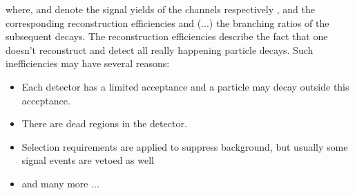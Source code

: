 where, \NDp and \NLc denote the signal yields of the channels \LbToDpmunuX respectively \LbToLcmunu, \effDp and \effLc the corresponding reconstruction efficiencies and \BR(...) the branching ratios of the subsequent decays.
The reconstruction efficiencies describe the fact that one doesn't reconstruct and detect all really happening particle decays.
Such inefficiencies may have several reasons:
\begin{itemize}
    \item Each detector has a limited acceptance and a particle may decay outside this acceptance.
    \item There are dead regions in the detector.
    \item Selection requirements are applied to suppress background, but usually some signal events are vetoed as well
    \item and many more ...
\end{itemize}

